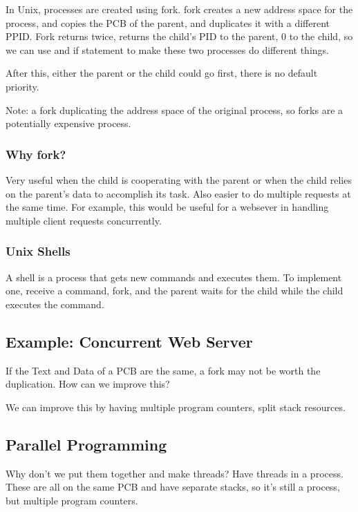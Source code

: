 \documentclass{article}
\begin{document}
In Unix, processes are created using fork. fork creates a new address space for the process, and copies the PCB of the parent, and duplicates it with a different PPID. Fork returns twice, returns the child's PID to the parent, 0 to the child, so we can use and if statement to make these two processes do different things.

After this, either the parent or the child could go first, there is no default priority.

Note: a fork duplicating the address space of the original process, so forks are a potentially expensive process.

\subsubsection{Why fork?}

Very useful when the child is cooperating with the parent or when the child relies on the parent's data to accomplish its task. Also easier to do multiple requests at the same time. For example, this would be useful for a websever in handling multiple client requests concurrently.

\subsubsection{Unix Shells}

A shell is a process that gets new commands and executes them. To implement one, receive a command, fork, and the parent waits for the child while the child executes the command.

\subsection{Example: Concurrent Web Server}

If the Text and Data of a PCB are the same, a fork may not be worth the duplication. How can we improve this?

We can improve this by having multiple program counters, split stack resources.

\subsection{Parallel Programming}

Why don't we put them together and make threads? Have threads in a process. These are all on the same PCB and have separate stacks, so it's still a process, but multiple program counters.
\end{document}
